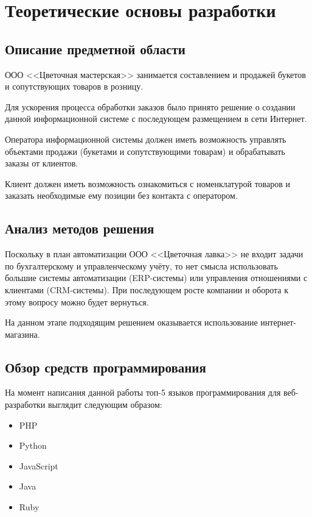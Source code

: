 \section{Теоретические основы разработки}

\subsection{Описание предметной области}

ООО <<Цветочная мастерская>> занимается составлением и продажей букетов и сопутствующих товаров в розницу.

Для ускорения процесса обработки заказов было принято решение о создании данной информационной системе с последующем размещением в сети Интернет.

Оператора информационной системы должен иметь возможность управлять объектами продажи (букетами и сопутствующими товарам) и обрабатывать заказы от клиентов.

Клиент должен иметь возможность ознакомиться с номенклатурой товаров и заказать необходимые ему позиции без контакта с оператором.

\subsection{Анализ методов решения}

Поскольку в план автоматизации ООО <<Цветочная лавка>> не входит задачи по бухгалтерскому и управленческому учёту, то нет смысла использовать большие системы автоматизации (ERP-системы) или управления отношениями с клиентами (CRM-системы). При последующем росте компании и оборота к этому вопросу можно будет вернуться. 

На данном этапе подходящим решением оказывается использование интернет-магазина.

\subsection{Обзор средств программирования}

На момент написания данной работы топ-5 языков программирования для веб-разработки выглядит следующим образом:

\begin{itemize}
	\item PHP
	\item Python
	\item JavaScript
	\item Java
	\item Ruby
\end{itemize}

